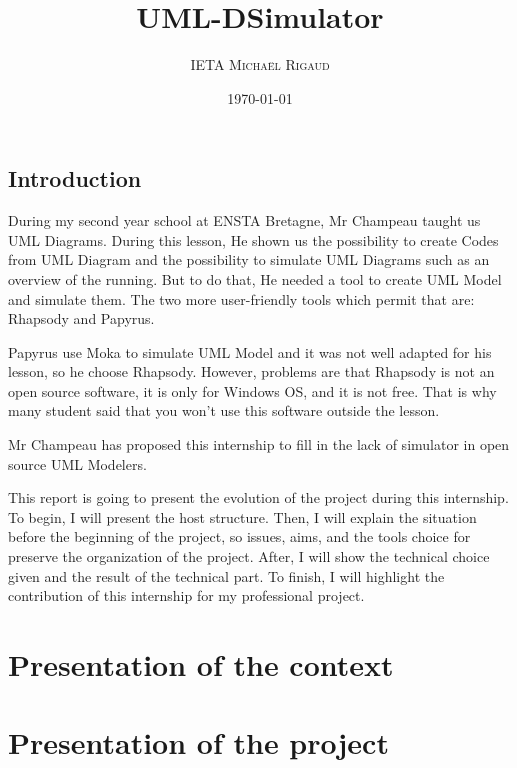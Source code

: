 \documentclass[a4paper, 11pt, oneside, oldfontcommands]{memoir}
\title{UML-DSimulator}
\author{\textsc{IETA Michaël Rigaud }}
\date{\today}
\newcounter{th}[chapter]
\begin{document}
\maketitle
\thispagestyle{empty}
\newpage




\tableofcontents



\chapter*{Introduction}

During my second year school at ENSTA Bretagne, Mr Champeau taught us UML Diagrams. During this lesson, He shown us the possibility to create Codes from UML Diagram and the possibility to simulate UML Diagrams such as an overview of the running. But to do that, He needed a tool to create UML Model and simulate them. The two more user-friendly tools which permit that are: Rhapsody and Papyrus.

Papyrus use Moka to simulate UML Model and it was not well adapted for his lesson, so he choose Rhapsody. However, problems are that Rhapsody is not an open source software, it is only for Windows OS, and it is not free. That is why many student said that you won't use this software outside the lesson.

Mr Champeau has proposed this internship to fill in the lack of simulator in open source UML Modelers.

This report is going to present the evolution of the project during this internship. To begin, I will present the host structure. Then, I will explain the situation before the beginning of the project, so issues, aims, and the tools choice for preserve the organization of the project. After, I will show the technical choice given and the result of the technical part. To finish, I will highlight the contribution of this internship for my professional project.

\newpage

\part{Presentation of the context}




\part{Presentation of the project}
\end{document}
